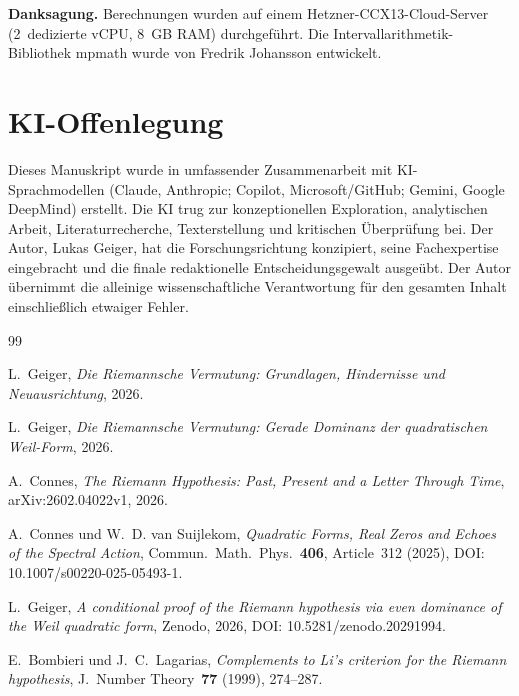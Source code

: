 \documentclass[12pt,a4paper]{article}
\theoremstyle{definition}
\theoremstyle{remark}
\begin{document}
\bigskip
\noindent\textbf{Danksagung.} Berechnungen wurden auf einem Hetzner-CCX13-Cloud-Server (2~dedizierte vCPU, 8~GB RAM) durchgeführt. Die Intervallarithmetik-Bibliothek mpmath wurde von Fredrik Johansson entwickelt.


\section*{KI-Offenlegung}

Dieses Manuskript wurde in umfassender Zusammenarbeit mit KI-Sprachmodellen (Claude, Anthropic; Copilot, Microsoft/GitHub; Gemini, Google DeepMind) erstellt. Die KI trug zur konzeptionellen Exploration, analytischen Arbeit, Literaturrecherche, Texterstellung und kritischen Überprüfung bei. Der Autor, Lukas Geiger, hat die Forschungsrichtung konzipiert, seine Fachexpertise eingebracht und die finale redaktionelle Entscheidungsgewalt ausgeübt. Der Autor übernimmt die alleinige wissenschaftliche Verantwortung für den gesamten Inhalt einschließlich etwaiger Fehler.


\begin{thebibliography}{99}

L.~Geiger, \emph{Die Riemannsche Vermutung: Grundlagen, Hindernisse und Neuausrichtung}, 2026.

L.~Geiger, \emph{Die Riemannsche Vermutung: Gerade Dominanz der quadratischen Weil-Form}, 2026.

A.~Connes, \emph{The Riemann Hypothesis: Past, Present and a Letter Through Time}, arXiv:2602.04022v1, 2026.

A.~Connes und W.~D. van Suijlekom, \emph{Quadratic Forms, Real Zeros and Echoes of the Spectral Action}, Commun.~Math.~Phys.~\textbf{406}, Article~312 (2025), DOI: 10.1007/s00220-025-05493-1.

L.~Geiger, \emph{A conditional proof of the Riemann hypothesis via even dominance of the Weil quadratic form}, Zenodo, 2026, DOI: 10.5281/zenodo.20291994. %

E.~Bombieri und J.~C.~Lagarias, \emph{Complements to Li's criterion for the Riemann hypothesis}, J.~Number Theory~\textbf{77} (1999), 274--287.

\end{thebibliography}
\end{document}
